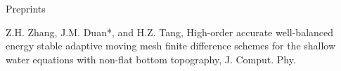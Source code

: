 \begin{cvpublicationsection}{Preprints}
\item[\pubenum] Z.H. Zhang, J.M. Duan*, and H.Z. Tang, High-order accurate well-balanced energy stable adaptive moving mesh finite difference schemes for the shallow water equations with non-flat bottom topography, J. Comput. Phy.
\end{cvpublicationsection}
